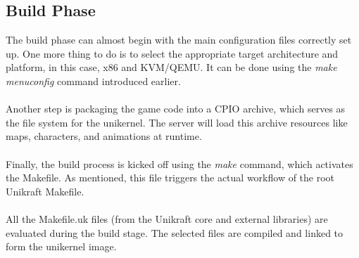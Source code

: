 \subsection{Build Phase}
The build phase can almost begin with the main configuration files correctly set up.\@
One more thing to do is to select the appropriate target architecture and platform, in this case, x86 and KVM/QEMU. It can be done using the \textit{make menuconfig} command introduced earlier. \\ \\
Another step is packaging the game code into a CPIO archive, which serves as the file system for the unikernel.
The server will load this archive resources like maps, characters, and animations at runtime. \\ \\
Finally, the build process is kicked off using the \textit{make} command, which activates the Makefile.\@
As mentioned, this file triggers the actual workflow of the root Unikraft Makefile. \\ \\
All the Makefile.uk files (from the Unikraft core and external libraries) are evaluated during the build stage\cite{unikraft-build-process}. The selected files are compiled and linked to form the unikernel image.
\\
\\  
